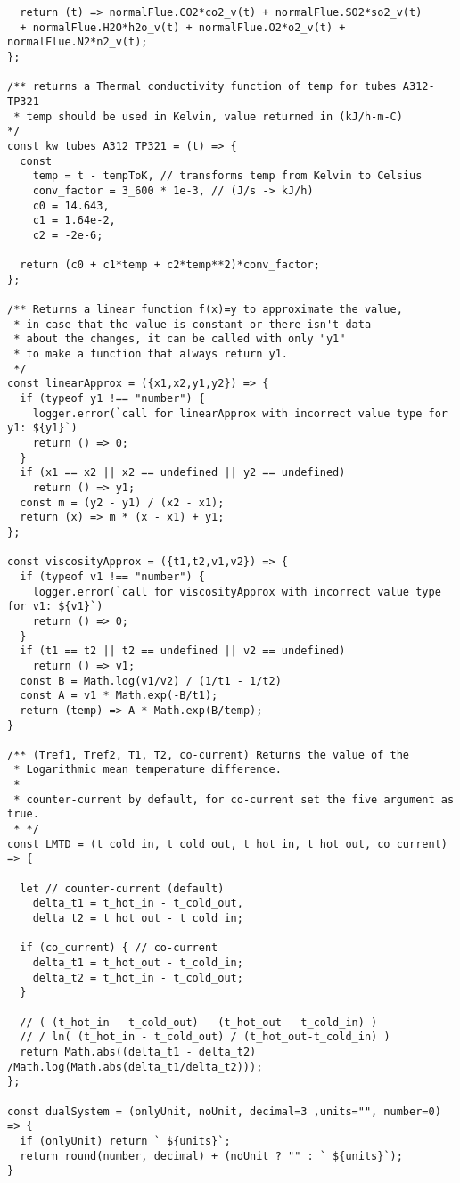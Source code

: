 \begin{verbatim}
  return (t) => normalFlue.CO2*co2_v(t) + normalFlue.SO2*so2_v(t)
  + normalFlue.H2O*h2o_v(t) + normalFlue.O2*o2_v(t) + normalFlue.N2*n2_v(t);
};

/** returns a Thermal conductivity function of temp for tubes A312‐TP321 
 * temp should be used in Kelvin, value returned in (kJ/h-m-C)
*/
const kw_tubes_A312_TP321 = (t) => {
  const 
    temp = t - tempToK, // transforms temp from Kelvin to Celsius
    conv_factor = 3_600 * 1e-3, // (J/s -> kJ/h)
    c0 = 14.643,
    c1 = 1.64e-2,
    c2 = -2e-6;

  return (c0 + c1*temp + c2*temp**2)*conv_factor;
};

/** Returns a linear function f(x)=y to approximate the value,
 * in case that the value is constant or there isn't data
 * about the changes, it can be called with only "y1"
 * to make a function that always return y1.
 */
const linearApprox = ({x1,x2,y1,y2}) => {
  if (typeof y1 !== "number") {
    logger.error(`call for linearApprox with incorrect value type for y1: ${y1}`)
    return () => 0;
  }
  if (x1 == x2 || x2 == undefined || y2 == undefined) 
    return () => y1;
  const m = (y2 - y1) / (x2 - x1);
  return (x) => m * (x - x1) + y1;
};

const viscosityApprox = ({t1,t2,v1,v2}) => {
  if (typeof v1 !== "number") {
    logger.error(`call for viscosityApprox with incorrect value type for v1: ${v1}`)
    return () => 0;
  }
  if (t1 == t2 || t2 == undefined || v2 == undefined) 
    return () => v1;
  const B = Math.log(v1/v2) / (1/t1 - 1/t2)
  const A = v1 * Math.exp(-B/t1);
  return (temp) => A * Math.exp(B/temp);
}

/** (Tref1, Tref2, T1, T2, co-current) Returns the value of the
 * Logarithmic mean temperature difference.
 * 
 * counter-current by default, for co-current set the five argument as true.
 * */
const LMTD = (t_cold_in, t_cold_out, t_hot_in, t_hot_out, co_current) => {
  
  let // counter-current (default)
    delta_t1 = t_hot_in - t_cold_out,
    delta_t2 = t_hot_out - t_cold_in;
    
  if (co_current) { // co-current
    delta_t1 = t_hot_out - t_cold_in;
    delta_t2 = t_hot_in - t_cold_out;
  }
    
  // ( (t_hot_in - t_cold_out) - (t_hot_out - t_cold_in) ) 
  // / ln( (t_hot_in - t_cold_out) / (t_hot_out-t_cold_in) )
  return Math.abs((delta_t1 - delta_t2) /Math.log(Math.abs(delta_t1/delta_t2)));
};

const dualSystem = (onlyUnit, noUnit, decimal=3 ,units="", number=0) => {
  if (onlyUnit) return ` ${units}`;
  return round(number, decimal) + (noUnit ? "" : ` ${units}`);
}


\end{verbatim}
